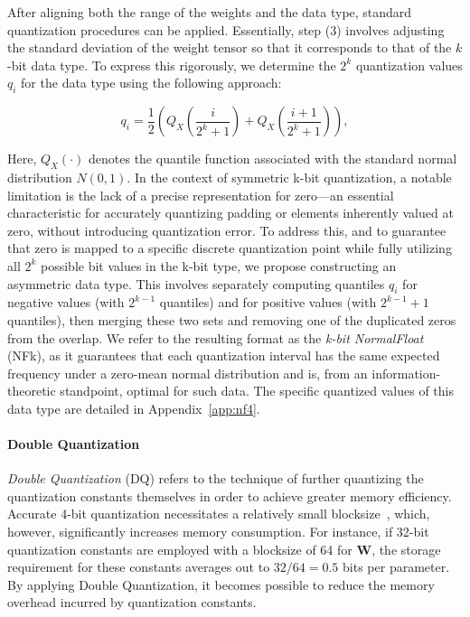 After aligning both the range of the weights and the data type, standard quantization procedures can be applied. Essentially, step (3) involves adjusting the standard deviation of the weight tensor so that it corresponds to that of the $k$-bit data type. To express this rigorously, we determine the $2^k$ quantization values $q_i$ for the data type using the following approach:

\begin{equation}
q_i  = \frac{1}{2}\left( Q_X\left(\frac{i}{2^k+1}\right) + Q_X\left(\frac{i+1}{2^k+1}\right)\right),
\end{equation}

Here, $Q_X(\cdot)$ denotes the quantile function associated with the standard normal distribution $N(0,1)$. In the context of symmetric k-bit quantization, a notable limitation is the lack of a precise representation for zero—an essential characteristic for accurately quantizing padding or elements inherently valued at zero, without introducing quantization error. To address this, and to guarantee that zero is mapped to a specific discrete quantization point while fully utilizing all $2^k$ possible bit values in the k-bit type, we propose constructing an asymmetric data type. This involves separately computing quantiles $q_i$ for negative values (with $2^{k-1}$ quantiles) and for positive values (with $2^{k-1}+1$ quantiles), then merging these two sets and removing one of the duplicated zeros from the overlap. We refer to the resulting format as the \emph{k-bit NormalFloat} (NFk), as it guarantees that each quantization interval has the same expected frequency under a zero-mean normal distribution and is, from an information-theoretic standpoint, optimal for such data. The specific quantized values of this data type are detailed in Appendix~\ref{app:nf4}.

\paragraph{Double Quantization{}}
\emph{Double Quantization} (DQ) refers to the technique of further quantizing the quantization constants themselves in order to achieve greater memory efficiency. Accurate 4-bit quantization necessitates a relatively small blocksize~\citep{dettmers2022case}, which, however, significantly increases memory consumption. For instance, if 32-bit quantization constants are employed with a blocksize of 64 for $\mathbf{W}$, the storage requirement for these constants averages out to $32/64 = 0.5$ bits per parameter. By applying Double Quantization, it becomes possible to reduce the memory overhead incurred by quantization constants.

